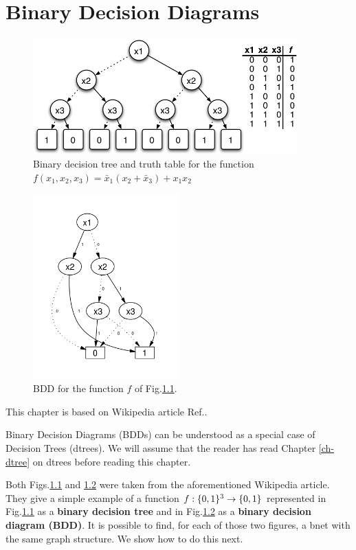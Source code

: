 \chapter{Binary Decision Diagrams}\label{ch-binarydd}

\begin{figure}[h!]
\centering
\includegraphics[width=4in]{binarydd/bdd-tree.png}
\caption{Binary decision tree and truth table 
for the function $
f(x_1, x_2,x_3)=
\bar{x}_1(x_2+\bar{x}_3)  + x_1 x_2 $ }
\label{fig-bdd-tree}
\end{figure}

\begin{figure}[h!]
\centering
\includegraphics[width=2.2in]{binarydd/bdd.png}
\caption{BDD for the function $f$
of Fig.\ref{fig-bdd-tree}.} 
\label{fig-bdd-bdd}
\end{figure}

This chapter is based
on Wikipedia article Ref.\cite{wiki-bdd}.

Binary Decision Diagrams (BDDs)
can be understood as a special
case of Decision Trees (dtrees).
We will
assume
that the reader has read
Chapter \ref{ch-dtree} 
on dtrees before
reading this chapter.



Both Figs.\ref{fig-bdd-tree}
and \ref{fig-bdd-bdd} were taken
from the aforementioned Wikipedia article. They
give a simple example of a function
$f:\{0,1\}^3\rightarrow\{0,1\}$
represented in
Fig.\ref{fig-bdd-tree} as a
{\bf binary decision tree}
 and in Fig.\ref{fig-bdd-bdd} as a {\bf binary
decision diagram (BDD)}.
It is possible to find,
 for each  of those two
figures, a bnet with
the same graph structure.
We show how to do this next.

